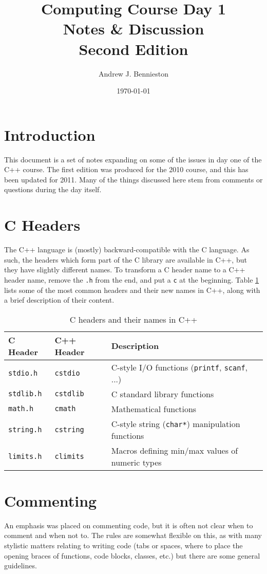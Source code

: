 \documentclass[a4paper]{scrartcl}
\title{Computing Course Day 1\\
Notes \& Discussion\\
Second Edition}
\author{Andrew J. Bennieston}
\date{\today}
\begin{document}
\maketitle

\tableofcontents

\pagebreak

\section{Introduction}
This document is a set of notes expanding on some of the issues in day one of the C++ course. The first edition was produced for the 2010 course, and this has been updated for 2011. Many of the things discussed here stem from comments or questions during the day itself.

\section{C Headers}
The C++ language is (mostly) backward-compatible with the C language. As such, the headers which form part of the C library are available in C++, but they have slightly different names. To transform a C header name to a C++ header name, remove the \texttt{.h} from the end, and put a \texttt{c} at the beginning. Table \ref{c-cpp-headers} lists some of the most common headers and their new names in C++, along with a brief description of their content.

\begin{table}[h]
\centering
\begin{tabular}{lll}
\toprule
C Header & C++ Header & Description \\
\midrule
\texttt{stdio.h} & \texttt{cstdio} & C-style I/O functions (\texttt{printf}, \texttt{scanf}, ...) \\
\texttt{stdlib.h} & \texttt{cstdlib} & C standard library functions \\
\texttt{math.h} & \texttt{cmath} & Mathematical functions \\
\texttt{string.h} & \texttt{cstring} & C-style string (\texttt{char*}) manipulation functions \\
\texttt{limits.h} & \texttt{climits} & Macros defining min/max values of numeric types \\
\bottomrule
\end{tabular}
\caption{\label{c-cpp-headers}C headers and their names in C++}
\end{table}

\section{Commenting}
An emphasis was placed on commenting code, but it is often not clear when to comment and when not to. The rules are somewhat flexible on this, as with many stylistic matters relating to writing code (tabs or spaces, where to place the opening braces of functions, code blocks, classes, etc.) but there are some general guidelines.
\end{document}
